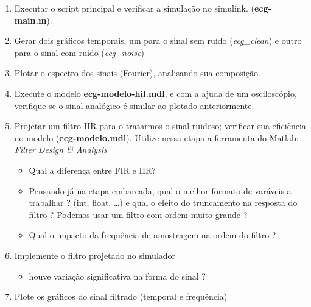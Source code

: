 \documentclass[11pt,a4paper]{scrartcl}
\begin{document}
\begin{enumerate}
\item Executar o script principal e verificar a simulação no simulink.  (\textbf{ecg-main.m}).

\item Gerar dois gráficos temporais, um para o sinal sem ruído (\textit{ecg\_clean}) e outro para o sinal com ruído (\textit{ecg\_noise})
	
\item Plotar o espectro dos sinais (Fourier), analisando sua composição.

\item Execute o modelo \textbf{ecg-modelo-hil.mdl}, e com a ajuda de um osciloscópio, verifique se o sinal analógico é similar ao plotado anteriormente.

\item Projetar um filtro IIR para o tratarmos o sinal ruidoso; verificar sua eficiência no modelo (\textbf{ecg-modelo.mdl}). Utilize nessa etapa a ferramenta do Matlab: \textit{Filter Design \& Analysis}

		\begin{itemize}
			\item Qual a diferença entre FIR e IIR?
			\item Pensando já na etapa embarcada, qual o melhor formato de varáveis a trabalhar ? (int, float, \ldots) e qual o efeito do truncamento na resposta do filtro ? Podemos usar um filtro com ordem muito grande ?
			\item Qual o impacto da frequência de amostragem na ordem do filtro ?
		\end{itemize}

	\item Implemente o filtro projetado no simulador 
		\begin{itemize}
			\item houve variação significativa na forma do sinal ?
		\end{itemize}
	
	\item Plote os gráficos do sinal filtrado (temporal e frequência)

\end{enumerate}
\end{document}

